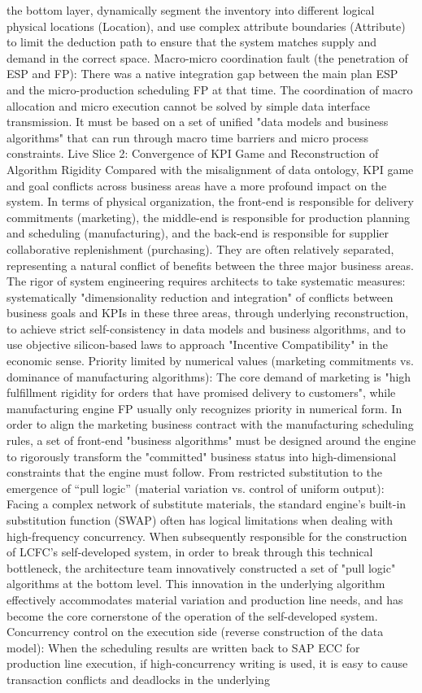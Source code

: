 \documentclass[11pt,a4paper]{article}
\begin{document}
the bottom layer, dynamically segment the inventory into different logical physical locations (Location), and use complex attribute boundaries (Attribute) to limit the deduction path to ensure that the system matches supply and demand in the correct space. Macro-micro coordination fault (the penetration of ESP and FP): There was a native integration gap between the main plan ESP and the micro-production scheduling FP at that time. The coordination of macro allocation and micro execution cannot be solved by simple data interface transmission. It must be based on a set of unified "data models and business algorithms" that can run through macro time barriers and micro process constraints. Live Slice 2: Convergence of KPI Game and Reconstruction of Algorithm Rigidity Compared with the misalignment of data ontology, KPI game and goal conflicts across business areas have a more profound impact on the system. In terms of physical organization, the front-end is responsible for delivery commitments (marketing), the middle-end is responsible for production planning and scheduling (manufacturing), and the back-end is responsible for supplier collaborative replenishment (purchasing). They are often relatively separated, representing a natural conflict of benefits between the three major business areas. The rigor of system engineering requires architects to take systematic measures: systematically "dimensionality reduction and integration" of conflicts between business goals and KPIs in these three areas, through underlying reconstruction, to achieve strict self-consistency in data models and business algorithms, and to use objective silicon-based laws to approach "Incentive Compatibility" in the economic sense. Priority limited by numerical values (marketing commitments vs. dominance of manufacturing algorithms): The core demand of marketing is "high fulfillment rigidity for orders that have promised delivery to customers", while manufacturing engine FP usually only recognizes priority in numerical form. In order to align the marketing business contract with the manufacturing scheduling rules, a set of front-end "business algorithms" must be designed around the engine to rigorously transform the "committed" business status into high-dimensional constraints that the engine must follow. From restricted substitution to the emergence of “pull logic” (material variation vs. control of uniform output): Facing a complex network of substitute materials, the standard engine’s built-in substitution function (SWAP) often has logical limitations when dealing with high-frequency concurrency. When subsequently responsible for the construction of LCFC's self-developed system, in order to break through this technical bottleneck, the architecture team innovatively constructed a set of "pull logic" algorithms at the bottom level. This innovation in the underlying algorithm effectively accommodates material variation and production line needs, and has become the core cornerstone of the operation of the self-developed system. Concurrency control on the execution side (reverse construction of the data model): When the scheduling results are written back to SAP ECC for production line execution, if high-concurrency writing is used, it is easy to cause transaction conflicts and deadlocks in the underlying 
\end{document}

